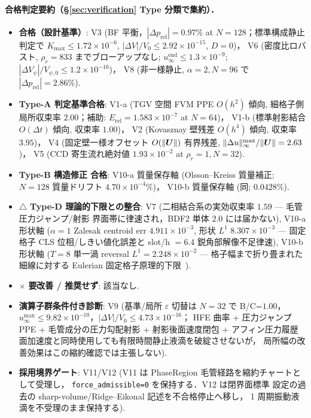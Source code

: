 \paragraph{合格判定要約（§\ref{sec:verification} Type 分類で集約）．}
\begin{itemize}\setlength{\itemsep}{0pt}
  \item \checkmark \textbf{合格（設計基準）}:
        V3 (BF 平衡，$|\Delta p_{\mathrm{rel}}|=0.97\%$ at $N=128$；標準構成静止判定で $K_{\max}\le1.72\!\times\!10^{-6}$, $|\Delta V|/V_0\le2.92\!\times\!10^{-15}$, $D=0$)，
        V6 (密度比ロバスト, $\rho_r=833$ までブローアップなし; $u_\infty^{\mathrm{end}}\le1.3\!\times\!10^{-9}$; $|\Delta V_\psi|/V_{\psi,0} \le 1.2\!\times\!10^{-16}$)，
        V8 (非一様静止, $\alpha=2,N=96$ で $|\Delta p_{\mathrm{rel}}|=2.86\%$).
  \item \checkmark \textbf{Type-A 判定基準合格}:
        V1-a (TGV 空間 FVM PPE $O(h^2)$ 傾向, 細格子側局所収束率 $2.00$；補助: $E_{\mathrm{rel}}=1.583\!\times\!10^{-7}$ at $N=64$)，
        V1-b (標準射影結合 $O(\Delta t)$ 傾向, 収束率 $1.00$)，
        V2 (Kovasznay 壁残差 $O(h^4)$ 傾向, 収束率 $3.95$)，
        V4 (固定壁一様オフセット $O(\|\bm{U}\|)$ 有界残差, $\|\Delta u\|_\infty^{\max}/\|\bm{U}\| = 2.63$)，
        V5 (CCD 寄生流れ絶対値 $1.93\!\times\!10^{-2}$ at $\rho_r=1, N=32$).
  \item \checkmark \textbf{Type-B 構造修正 合格}:
        V10-a 質量保存軸 (Olsson--Kreiss 質量補正; $N=128$ 質量ドリフト $4.70\!\times\!10^{-4}\%$)，
        V10-b 質量保存軸 (同; $0.0428\%$).
  \item $\triangle$ \textbf{Type-D 理論的下限との整合}:
        V7 (二相結合系の実効収束率 $1.59$ — 毛管圧力ジャンプ/射影
        界面帯に律速され，BDF2 単体 $2.0$ には届かない),
        V10-a 形状軸 ($\alpha=1$ Zalesak centroid err $4.911\times 10^{-3}$,
        形状 $L^1$ $8.307\times 10^{-3}$ — 固定格子 CLS 位相/しきい値化誤差と
        slot/h $=6.4$ 鋭角部解像不足律速),
        V10-b 形状軸 ($T=8$ 単一渦 reversal $L^1=2.248\times10^{-2}$
        — 格子幅まで折り畳まれた細線に対する Eulerian 固定格子原理的下限~\cite{EnrightFedkiwFerzigerMitchell2002}).
  \item $\times$ \textbf{要改善 / 推奨せず}: 該当なし.
  \item \checkmark \textbf{演算子群条件付き診断}: V9
        (基準/局所 $\varepsilon$ 切替は $N=32$ で B/C=$1.00$，$u_\infty^{\max}\le9.82\!\times\!10^{-10}$，$|\Delta V|/V_0\le4.73\!\times\!10^{-16}$；
        HFE 曲率 + 圧力ジャンプ PPE + 毛管成分の圧力勾配射影 + 射影後面速度閉包 + アフィン圧力履歴面加速度と同時使用しても有限時間静止液滴を破綻させないが，
        局所幅の改善効果はこの縮約確認では主張しない).
  \item \checkmark \textbf{採用境界ゲート}: V11/V12
        (V11 は PhaseRegion 毛管経路を縮約チャートとして受理し，
        \texttt{force\_admissible=0} を保持する．V12 は閉界面標準
        設定の過去の sharp-volume/Ridge--Eikonal 記述を不合格停止へ移し，
        1 周期振動液滴を不受理のまま保持する).
\end{itemize}

